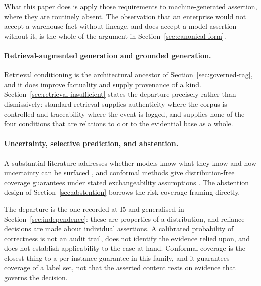 What this paper does is apply those requirements to machine-generated assertion, where
they are routinely absent. The observation that an enterprise would not accept a
warehouse fact without lineage, and does accept a model assertion without it, is the
whole of the argument in Section~\ref{sec:canonical-form}.

\paragraph{Retrieval-augmented generation and grounded generation.} Retrieval
conditioning \citep{lewis2020} is the architectural ancestor of
Section~\ref{sec:governed-rag}, and it does improve factuality and supply provenance
of a kind. Section~\ref{sec:retrieval-insufficient} states the departure precisely
rather than dismissively: standard retrieval supplies authenticity where the corpus is
controlled and traceability where the event is logged, and supplies none of the four
conditions that are relations to $c$ or to the evidential base as a whole.

\paragraph{Uncertainty, selective prediction, and abstention.} A substantial
literature addresses whether models know what they know and how uncertainty can be
surfaced \citep{kadavath2022,lin2022}, and conformal methods give distribution-free
coverage guarantees under stated exchangeability assumptions
\citep{angelopoulos2023}. The abstention design of Section~\ref{sec:abstention}
borrows the risk-coverage framing directly.

The departure is the one recorded at I5 and generalised in
Section~\ref{sec:independence}: these are properties of a distribution, and reliance
decisions are made about individual assertions. A calibrated probability of
correctness is not an audit trail, does not identify the evidence relied upon, and
does not establish applicability to the case at hand. Conformal coverage is the
closest thing to a per-instance guarantee in this family, and it guarantees coverage
of a label set, not that the asserted content rests on evidence that governs the
decision.


